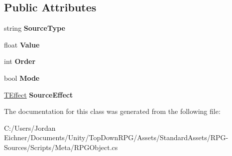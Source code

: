 \subsection*{Public Attributes}
\begin{DoxyCompactItemize}
\item 
\hypertarget{class_r_p_g_object_1_1_attribut_modification_helper_1_1_modification_a209f4406dff4c1139b883f437c838c97}{}string {\bfseries Source\+Type}\label{class_r_p_g_object_1_1_attribut_modification_helper_1_1_modification_a209f4406dff4c1139b883f437c838c97}

\item 
\hypertarget{class_r_p_g_object_1_1_attribut_modification_helper_1_1_modification_ac47bbc3b20ca8250893a20e816feecd1}{}float {\bfseries Value}\label{class_r_p_g_object_1_1_attribut_modification_helper_1_1_modification_ac47bbc3b20ca8250893a20e816feecd1}

\item 
\hypertarget{class_r_p_g_object_1_1_attribut_modification_helper_1_1_modification_a5cab54c13609d00e3a0963aecf29109b}{}int {\bfseries Order}\label{class_r_p_g_object_1_1_attribut_modification_helper_1_1_modification_a5cab54c13609d00e3a0963aecf29109b}

\item 
\hypertarget{class_r_p_g_object_1_1_attribut_modification_helper_1_1_modification_ad4e4f83e54f7b0fec528d815c2cfc847}{}bool {\bfseries Mode}\label{class_r_p_g_object_1_1_attribut_modification_helper_1_1_modification_ad4e4f83e54f7b0fec528d815c2cfc847}

\item 
\hypertarget{class_r_p_g_object_1_1_attribut_modification_helper_1_1_modification_a096613a99f591c94f53e96bc31c20f73}{}\hyperlink{class_t_effect}{T\+Effect} {\bfseries Source\+Effect}\label{class_r_p_g_object_1_1_attribut_modification_helper_1_1_modification_a096613a99f591c94f53e96bc31c20f73}

\end{DoxyCompactItemize}


The documentation for this class was generated from the following file\+:\begin{DoxyCompactItemize}
\item 
C\+:/\+Users/\+Jordan Eichner/\+Documents/\+Unity/\+Top\+Down\+R\+P\+G/\+Assets/\+Standard\+Assets/\+R\+P\+G-\/\+Sources/\+Scripts/\+Meta/R\+P\+G\+Object.\+cs\end{DoxyCompactItemize}
